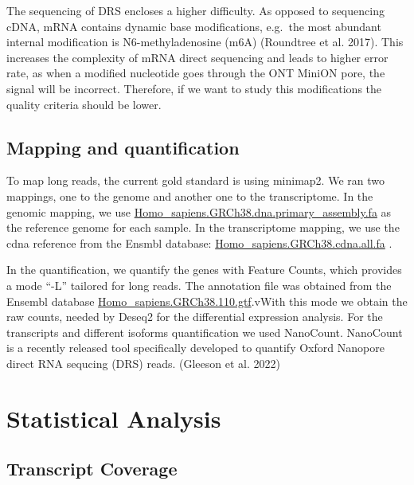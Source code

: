 \documentclass[
  letterpaper,
  DIV=11,
  numbers=noendperiod]{scrartcl}
\begin{document}
The sequencing of DRS encloses a higher difficulty. As opposed to
sequencing cDNA, mRNA contains dynamic base modifications, e.g.~the most
abundant internal modification is N6-methyladenosine (m6A) (Roundtree et
al. 2017). This increases the complexity of mRNA direct sequencing and
leads to higher error rate, as when a modified nucleotide goes through
the ONT MiniON pore, the signal will be incorrect. Therefore, if we want
to study this modifications the quality criteria should be lower.

\hypertarget{mapping-and-quantification}{%
\subsection{Mapping and
quantification}\label{mapping-and-quantification}}

To map long reads, the current gold standard is using minimap2. We ran
two mappings, one to the genome and another one to the transcriptome. In
the genomic mapping, we use
\href{https://ftp.ensembl.org/pub/release-110/fasta/homo_sapiens/dna/}{Homo\_sapiens.GRCh38.dna.primary\_assembly.fa}
as the reference genome for each sample. In the transcriptome mapping,
we use the cdna reference from the Ensmbl database:
\href{https://ftp.ensembl.org/pub/release-110/fasta/homo_sapiens/cdna/}{Homo\_sapiens.GRCh38.cdna.all.fa}
.

In the quantification, we quantify the genes with Feature Counts, which
provides a mode ``-L'' tailored for long reads. The annotation file was
obtained from the Ensembl database
\href{https://ftp.ensembl.org/pub/release-110/gtf/homo_sapiens/}{Homo\_sapiens.GRCh38.110.gtf}.vWith
this mode we obtain the raw counts, needed by Deseq2 for the
differential expression analysis. For the transcripts and different
isoforms quantification we used NanoCount. NanoCount is a recently
released tool specifically developed to quantify Oxford Nanopore direct
RNA sequcing (DRS) reads. (Gleeson et al. 2022)

\hypertarget{statistical-analysis}{%
\section{Statistical Analysis}\label{statistical-analysis}}

\hypertarget{transcript-coverage}{%
\subsection{Transcript Coverage}\label{transcript-coverage}}
\end{document}
